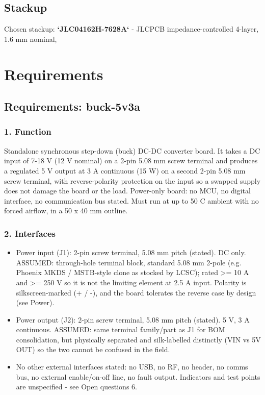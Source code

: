 \documentclass[11pt,a4paper]{article}
\begin{document}
\subsection*{Stackup}
Chosen stackup: \textbf{`JLC04162H-7628A`} - JLCPCB impedance-controlled 4-layer, 1.6 mm nominal,
\section{Requirements}
\subsection*{Requirements: buck-5v3a}
\subsubsection*{1. Function}
Standalone synchronous step-down (buck) DC-DC converter board. It takes a DC input of 7-18 V (12 V nominal) on a 2-pin 5.08 mm screw terminal and produces a regulated 5 V output at 3 A continuous (15 W) on a second 2-pin 5.08 mm screw terminal, with reverse-polarity protection on the input so a swapped supply does not damage the board or the load. Power-only board: no MCU, no digital interface, no communication bus stated. Must run at up to 50 C ambient with no forced airflow, in a 50 x 40 mm outline.

\subsubsection*{2. Interfaces}
\begin{itemize}
\item Power input (J1): 2-pin screw terminal, 5.08 mm pitch (stated). DC only.
ASSUMED: through-hole terminal block, standard 5.08 mm 2-pole (e.g.
Phoenix MKDS / MSTB-style clone as stocked by LCSC); rated \textgreater{}= 10 A and
\textgreater{}= 250 V so it is not the limiting element at 2.5 A input. Polarity is
silkscreen-marked (+ / -), and the board tolerates the reverse case by
design (see Power).
\item Power output (J2): 2-pin screw terminal, 5.08 mm pitch (stated). 5 V,
3 A continuous. ASSUMED: same terminal family/part as J1 for BOM
consolidation, but physically separated and silk-labelled distinctly
(VIN vs 5V OUT) so the two cannot be confused in the field.
\item No other external interfaces stated: no USB, no RF, no header, no
comms bus, no external enable/on-off line, no fault output. Indicators
and test points are unspecified - see Open questions 6.
\end{itemize}
\end{document}
